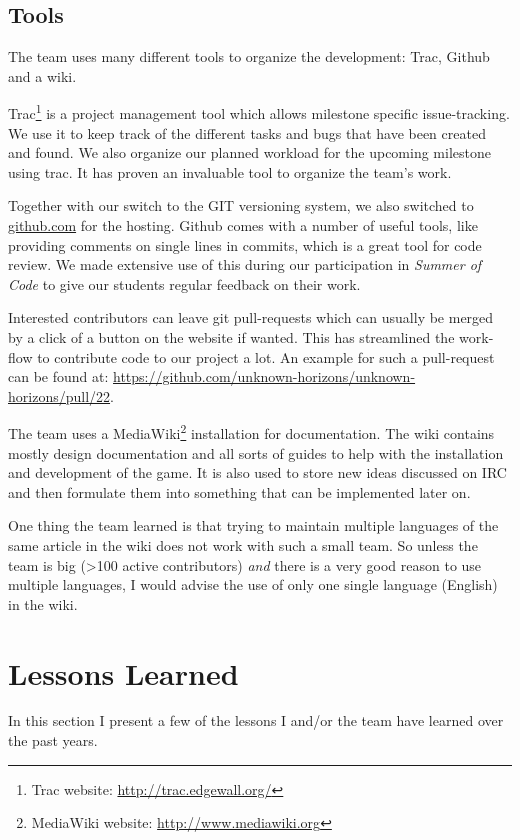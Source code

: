 \subsection{Tools}
The team uses many different tools to organize the development: Trac, Github and a wiki.

Trac\footnote{Trac website: \url{http://trac.edgewall.org/}} is a project management tool which allows milestone specific issue-tracking. We use it to keep track of the
different tasks and bugs that have been created and found. We also organize our planned workload for the upcoming
milestone using trac. It has proven an invaluable tool to organize the team's work.

Together with our switch to the GIT versioning system, we also switched to \href{http://www.github.com}{github.com} for the hosting. Github comes with a
number of useful tools, like providing comments on single lines in commits, which is a great tool for code review. We made
extensive use of this during our participation in \textit{Summer of Code} to give our students regular feedback on
their work.

Interested contributors can leave git pull-requests which can usually be merged by a click of a button on
the website if wanted. This has streamlined the work-flow to contribute code to our project a lot. An example for such a
pull-request can be found at: \url{https://github.com/unknown-horizons/unknown-horizons/pull/22}.

The team uses a MediaWiki\footnote{MediaWiki website: \url{http://www.mediawiki.org}} installation for documentation.
The wiki contains mostly design documentation and all sorts of
guides to help with the installation and development of the game. It is also used to store new ideas discussed on IRC
and then formulate them into something that can be implemented later on.

One thing the team learned is that trying to
maintain multiple languages of the same article in the wiki does not work with such a small team. So unless the team is
big (>100 active contributors) \textit{and} there is a very good reason to use multiple languages, I would advise the use of only
one single language (English) in the wiki.

\section{Lessons Learned}
In this section I present a few of the lessons I and/or the team have learned over the past years.

